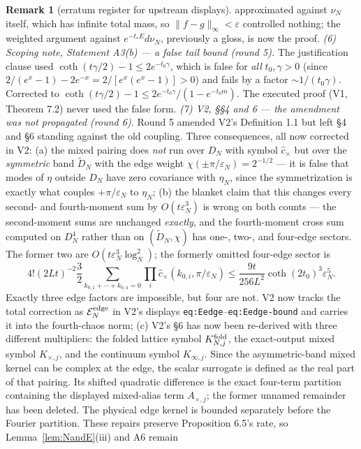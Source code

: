 \documentclass[11pt,a4paper]{article}
\theoremstyle{plain}
\theoremstyle{definition}
\newtheorem{remark}[theorem]{Remark}
\newcommand{\eps}{\varepsilon}
\begin{document}
\begin{remark}[erratum register for upstream displays]
approximated against $\nu_N$ itself, which has infinite total mass, so
$\|f-g\|_\infty<\eps$ controlled nothing; the weighted argument against
$e^{-t_*E}d\nu_N$, previously a gloss, is now the proof.
\emph{(6) Scoping note, Statement A3(b) --- a false tail bound (round 5).} The
justification clause used $\coth(t\gamma/2)-1\le2e^{-t_0\gamma}$, which is false for
\emph{all} $t_0,\gamma>0$ (since $2/(e^x-1)-2e^{-x}=2/[e^x(e^x-1)]>0$) and fails by a
factor $\sim1/(t_0\gamma)$. Corrected to
$\coth(t\gamma/2)-1\le2e^{-t_0\gamma}/(1-e^{-t_0m})$. The executed proof (V1,
Theorem 7.2) never used the false form.
\emph{(7) V2, \S\S4 and 6 --- the amendment was not propagated (round 6).} Round 5
amended V2's Definition 1.1 but left \S4 and \S6 standing against the old coupling.
Three consequences, all now corrected in V2: (a) the mixed pairing does \emph{not}
run over $D_N$ with symbol $\hat c_\times$ but over the \emph{symmetric} band
$\tilde D_N$ with the edge weight $\chi(\pm\pi/\eps_N)=2^{-1/2}$ --- it is false that
modes of $\eta$ outside $D_N$ have zero covariance with $\eta_N$, since the
symmetrization is exactly what couples $+\pi/\eps_N$ to $\eta_N$; (b) the blanket
claim that this changes every second- and fourth-moment sum by $O(t\eps_N^3)$ is
wrong on both counts --- the second-moment sums are unchanged \emph{exactly}, and the
fourth-moment cross sum computed on $D_N^4$ rather than on $(\tilde D_N,\chi)$ has
one-, two-, and four-edge sectors.  The former two are
$O(t\eps_N^3\log_N^2)$; the formerly omitted four-edge sector is
\[
 4!(2Lt)^{-2}\frac32
 \sum_{k_{0,1}+\cdots+k_{0,4}=0}\prod_i
 \hat c_\times(k_{0,i},\pi/\eps_N)
 \le\frac{9t}{256L^2}\coth(2t_0)^3\eps_N^5.
\]
Exactly three edge factors are impossible, but four are not.  V2 now tracks the
total correction as $\mathcal E_N^{\rm edge}$ in V2's displays
\texttt{eq:Eedge}--\texttt{eq:Eedge-bound} and carries it into the
fourth-chaos norm;
(c) V2's \S6 has now been re-derived with three different multipliers: the folded
lattice symbol $K_{N,j}^{\rm fold}$, the exact-output mixed symbol
$K_{\times,j}$, and the continuum symbol $K_{\infty,j}$.  Since the
asymmetric-band mixed kernel can be complex at the edge, the scalar surrogate is
defined as the real part of that pairing.  Its shifted quadratic difference is
the exact four-term partition containing the displayed mixed-alias
term $A_{\times,j}$; the former unnamed remainder has been deleted.  The
physical edge kernel is bounded separately before the Fourier partition.  These
repairs preserve Proposition 6.5's rate, so Lemma~\ref{lem:NandE}(iii) and A6 remain

\end{remark}
\end{document}
